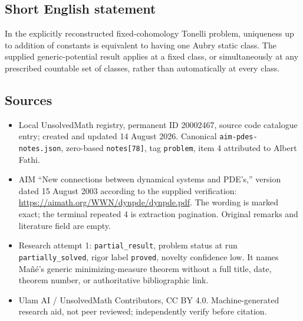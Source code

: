 \documentclass[11pt]{article}
\begin{document}
\subsection{Short English statement}
In the explicitly reconstructed fixed-cohomology Tonelli problem, uniqueness up to addition of constants is equivalent to having one Aubry static class. The supplied generic-potential result applies at a fixed class, or simultaneously at any prescribed countable set of classes, rather than automatically at every class.
\subsection{Sources}
\begin{itemize}
\item Local UnsolvedMath registry, permanent ID 20002467, source code catalogue entry; created and updated 14 August 2026. Canonical \texttt{aim-pdes-notes.json}, zero-based \texttt{notes[78]}, tag \texttt{problem}, item 4 attributed to Albert Fathi.
\item AIM ``New connections between dynamical systems and PDE's,'' version dated 15 August 2003 according to the supplied verification: \url{https://aimath.org/WWN/dynpde/dynpde.pdf}. The wording is marked exact; the terminal repeated 4 is extraction pagination. Original remarks and literature field are empty.
\item Research attempt 1: \texttt{partial\_result}, problem status at run \texttt{partially\_solved}, rigor label \texttt{proved}, novelty confidence low. It names Ma\~n\'e's generic minimizing-measure theorem without a full title, date, theorem number, or authoritative bibliographic link.
\item Ulam AI / UnsolvedMath Contributors, CC BY 4.0. Machine-generated research aid, not peer reviewed; independently verify before citation.
\end{itemize}
\end{document}
